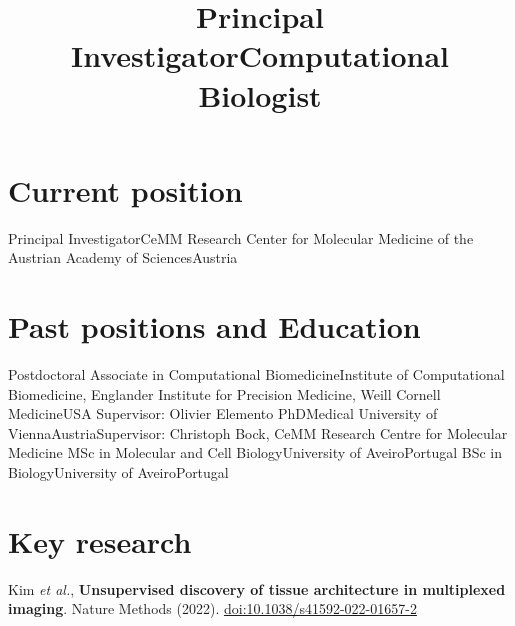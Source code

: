 \documentclass[11pt,a4paper,roman]{moderncv} %
\title{Principal Investigator\newline Computational Biologist}
\begin{document}
\makecvtitle %


\section{Current position}
    {Principal Investigator}{CeMM Research Center for Molecular Medicine of the Austrian Academy of Sciences}{Austria}
    {}{}


\section{Past positions and Education}
        {Postdoctoral Associate in Computational Biomedicine}{Institute of Computational Biomedicine, Englander Institute for Precision Medicine, Weill Cornell Medicine}{USA}
        {}{Supervisor: Olivier Elemento}
        {PhD}{Medical University of Vienna}{Austria}{}{Supervisor: Christoph Bock, CeMM Research Centre for Molecular Medicine}
        {MSc in Molecular and Cell Biology}{University of Aveiro}{Portugal}{}{}
        {BSc in Biology}{University of Aveiro}{Portugal}{}{}




\section{Key research}
        {Kim \textit{et al.}, \textbf{Unsupervised discovery of tissue architecture in multiplexed imaging}. Nature Methods (2022). \href{https://doi.org/10.1038/s41592-022-01657-2}{doi:10.1038/s41592-022-01657-2}}
\end{document}
